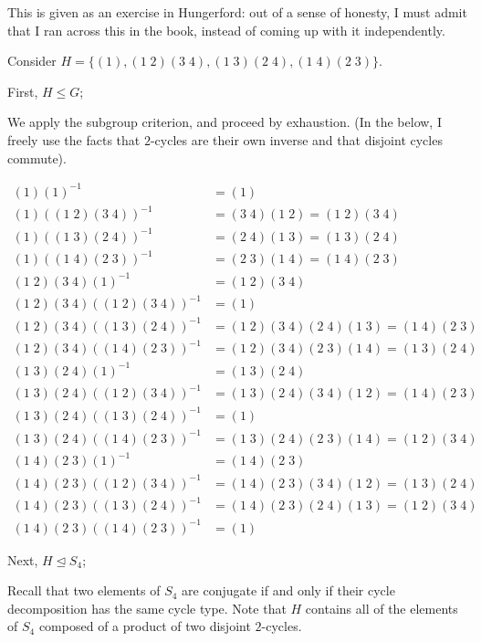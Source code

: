 \documentclass[a4paper,12pt]{article}
\newcommand{\tab}{\hspace{4mm}} %
\newcommand{\subgp}{\mathrel{\unlhd}}
\begin{document}
This is given as an exercise in Hungerford: out of a sense of honesty, I must admit that I ran across this in the book, instead of coming up with it independently.

Consider $ H =\{(1), (1 \; 2)(3 \; 4), (1 \; 3) (2 \; 4), (1 \; 4) (2 \; 3)\}$.

First, $H \leq G$;

\tab We apply the subgroup criterion, and proceed by exhaustion. (In the below, I freely use the facts that $2$-cycles are their own inverse and that disjoint cycles commute).

\begin{align*}
(1) (1)^{-1} &= (1)\\
(1) ((1 \; 2)(3 \; 4))^{-1} &= (3 \; 4)(1 \; 2) = (1 \; 2)(3 \; 4)\\
(1) ((1 \; 3) (2 \; 4))^{-1} &= (2 \; 4) (1 \; 3)  =  (1 \; 3) (2 \; 4)\\
(1) ((1 \; 4) (2 \; 3))^{-1} &=  (2 \; 3) (1 \; 4)= (1 \; 4) (2 \; 3)\\
(1 \; 2)(3 \; 4) (1)^{-1} &= (1 \; 2)(3 \; 4)\\
(1 \; 2)(3 \; 4) ((1 \; 2)(3 \; 4))^{-1} &= (1)\\
(1 \; 2)(3 \; 4) ((1 \; 3) (2 \; 4))^{-1} &= (1 \; 2)(3 \; 4) (2 \; 4) (1 \; 3) = (1 \; 4) (2 \; 3)\\
(1 \; 2)(3 \; 4) ((1 \; 4) (2 \; 3))^{-1} &= (1 \; 2)(3 \; 4) (2 \; 3) (1 \; 4) = (1 \; 3) (2 \; 4)\\
(1 \; 3) (2 \; 4) (1)^{-1} &= (1 \; 3) (2 \; 4)\\
(1 \; 3) (2 \; 4) ((1 \; 2)(3 \; 4))^{-1} &= (1 \; 3) (2 \; 4) (3 \; 4) (1 \; 2) =(1 \; 4) (2 \; 3)\\
(1 \; 3) (2 \; 4) ((1 \; 3) (2 \; 4))^{-1} &= (1)\\
(1 \; 3) (2 \; 4) ((1 \; 4) (2 \; 3))^{-1} &= (1 \; 3) (2 \; 4) (2 \; 3) (1 \; 4) = (1 \; 2) (3 \; 4)\\
(1 \; 4) (2 \; 3) (1)^{-1} &= (1 \; 4) (2 \; 3)\\
(1 \; 4) (2 \; 3) ((1 \; 2)(3 \; 4))^{-1} &= (1 \; 4) (2 \; 3) (3 \; 4) (1 \; 2) = (1 \; 3) (2 \; 4)\\
(1 \; 4) (2 \; 3) ((1 \; 3) (2 \; 4))^{-1} &= (1 \; 4) (2 \; 3) (2 \; 4) (1 \; 3) = (1 \; 2) (3 \; 4)\\
(1 \; 4) (2 \; 3) ((1 \; 4) (2 \; 3))^{-1} &= (1)
\end{align*}

Next, $H \subgp S_4$;

\tab Recall that two elements of $S_4$ are conjugate if and only if their cycle decomposition has the same cycle type. Note that $H$ contains all of the elements of $S_4$ composed of a product of two disjoint $2$-cycles.
\end{document}
